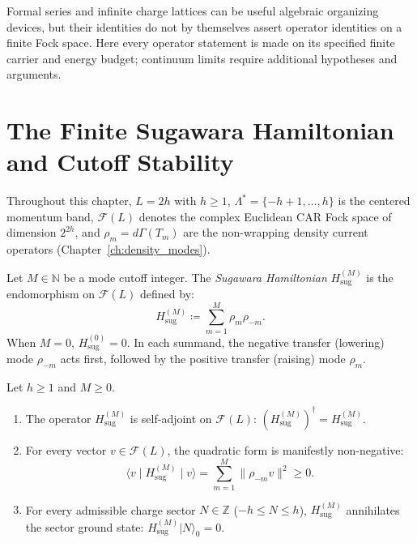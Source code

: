 \begin{remark}
Formal series and infinite charge lattices can be useful algebraic
organizing devices, but their identities do not by themselves assert
operator identities on a finite Fock space. Here every operator statement
is made on its specified finite carrier and energy budget; continuum limits
require additional hypotheses and arguments.
\end{remark}

\section{The Finite Sugawara Hamiltonian and Cutoff Stability}

Throughout this chapter, $L = 2h$ with $h \ge 1$, $\Lambda^* = \{-h+1, \dots, h\}$ is the centered momentum band, $\mathcal{F}(L)$ denotes the complex Euclidean CAR Fock space of dimension $2^{2h}$, and $\rho_m = d\Gamma(T_m)$ are the non-wrapping density current operators (Chapter~\ref{ch:density_modes}).

\begin{definition}
\label{def:sugawara_hamiltonian}
Let $M \in \mathbb{N}$ be a mode cutoff integer. The \emph{Sugawara Hamiltonian} $H_{\mathrm{sug}}^{(M)}$ is the endomorphism on $\mathcal{F}(L)$ defined by:
\begin{equation}
\label{eq:sugawara_def}
H_{\mathrm{sug}}^{(M)} \coloneqq \sum_{m=1}^M \rho_m \rho_{-m}.
\end{equation}
When $M = 0$, $H_{\mathrm{sug}}^{(0)} = 0$. In each summand, the negative transfer (lowering) mode $\rho_{-m}$ acts first, followed by the positive transfer (raising) mode $\rho_m$.
\end{definition}

\begin{proposition}
\label{prop:sugawara_positive}
Let $h \ge 1$ and $M \ge 0$.
\begin{enumerate}
    \item The operator $H_{\mathrm{sug}}^{(M)}$ is self-adjoint on $\mathcal{F}(L)$: $(H_{\mathrm{sug}}^{(M)})^\dagger = H_{\mathrm{sug}}^{(M)}$.
    \item For every vector $v \in \mathcal{F}(L)$, the quadratic form is manifestly non-negative:
    \begin{equation}
    \label{eq:sugawara_inner}
    \langle v \mid H_{\mathrm{sug}}^{(M)} \mid v \rangle = \sum_{m=1}^M \|\rho_{-m} v\|^2 \ge 0.
    \end{equation}
    \item For every admissible charge sector $N \in \mathbb{Z}$ ($-h \le N \le h$), $H_{\mathrm{sug}}^{(M)}$ annihilates the sector ground state: $H_{\mathrm{sug}}^{(M)} |N\rangle_0 = 0$.
\end{enumerate}
\end{proposition}

